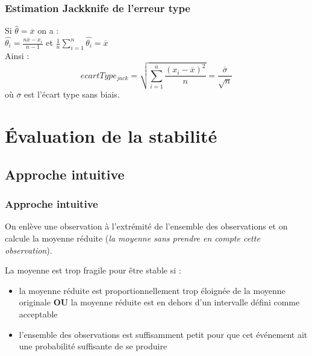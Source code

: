 \documentclass[handout]{beamer}
\begin{document}
		\begin{frame}
			\frametitle{Estimation Jackknife de l'erreur type}
			Si $\hat{\theta} = \overline{x}$ on a :\\

			\vspace{5px}
			$\hat{\theta_i} = \frac{n\overline{x} - x_i}{n - 1}$ et $\frac{1}{n} \sum\limits_{i=1}^n \hat{\theta_i} = \overline{x}$\\

			\vspace{15px}
			Ainsi :
			\[ecartType_{jack} = \sqrt{\sum\limits_{i=1}^n \frac{(x_i - \overline{x})^2}{n}} = \frac{\overline{\sigma}}{\sqrt{n}}\]
			où $\overline{\sigma}$ est l'écart type sans biais.
		\end{frame}

	\section{Évaluation de la stabilité}
		\subsection{Approche intuitive}
		\begin{frame}
			\frametitle{Approche intuitive}
			On enlève une observation à l'extrémité de l'ensemble des observations et on calcule la moyenne réduite (\textit{la moyenne sans prendre en compte cette observation}).

			\vspace{15px}
			La moyenne est trop fragile pour être stable si :
			\begin{itemize}
				\item la moyenne réduite est proportionnellement trop éloignée de la moyenne originale \textbf{OU} la moyenne réduite est en dehors d'un intervalle défini comme acceptable
				\item l'ensemble des observations est suffisamment petit pour que cet événement ait une probabilité suffisante de se produire
			\end{itemize}


		\end{frame}
\end{document}
